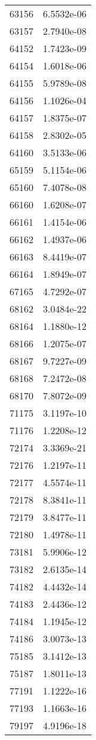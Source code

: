 \begin{table}[h!]
\begin{tabular}{|| c || c |}
63156 & 6.5532e-06 \\
63157 & 2.7940e-08 \\
64152 & 1.7423e-09 \\
64154 & 1.6018e-06 \\
64155 & 5.9789e-08 \\
64156 & 1.1026e-04 \\
64157 & 1.8375e-07 \\
64158 & 2.8302e-05 \\
64160 & 3.5133e-06 \\
65159 & 5.1154e-06 \\
65160 & 7.4078e-08 \\
66160 & 1.6208e-07 \\
66161 & 1.4154e-06 \\
66162 & 1.4937e-06 \\
66163 & 8.4419e-07 \\
66164 & 1.8949e-07 \\
67165 & 4.7292e-07 \\
68162 & 3.0484e-22 \\
68164 & 1.1880e-12 \\
68166 & 1.2075e-07 \\
68167 & 9.7227e-09 \\
68168 & 7.2472e-08 \\
68170 & 7.8072e-09 \\
71175 & 3.1197e-10 \\
71176 & 1.2208e-12 \\
72174 & 3.3369e-21 \\
72176 & 1.2197e-11 \\
72177 & 4.5574e-11 \\
72178 & 8.3841e-11 \\
72179 & 3.8477e-11 \\
72180 & 1.4978e-11 \\
73181 & 5.9906e-12 \\
73182 & 2.6135e-14 \\
74182 & 4.4432e-14 \\
74183 & 2.4436e-12 \\
74184 & 1.1945e-12 \\
74186 & 3.0073e-13 \\
75185 & 3.1412e-13 \\
75187 & 1.8011e-13 \\
77191 & 1.1222e-16 \\
77193 & 1.1663e-16 \\
79197 & 4.9196e-18 \\

\end{tabular}
\end{table}
